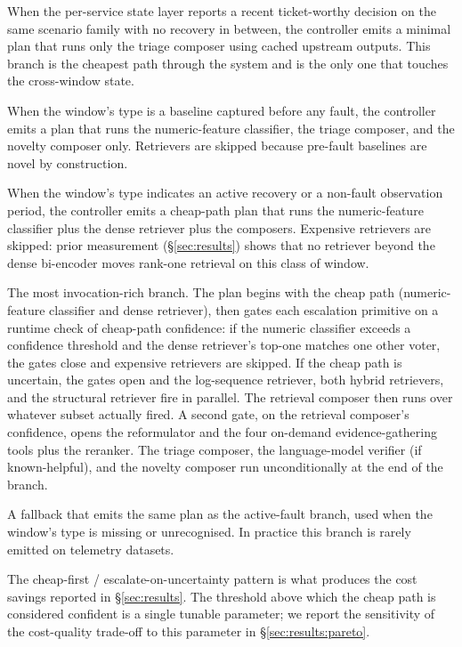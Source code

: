  When the per-service state layer reports a recent ticket-worthy decision on the same scenario family with no recovery in between, the controller emits a minimal plan that runs only the triage composer using cached upstream outputs. This branch is the cheapest path through the system and is the only one that touches the cross-window state.

 When the window's type is a baseline captured before any fault, the controller emits a plan that runs the numeric-feature classifier, the triage composer, and the novelty composer only. Retrievers are skipped because pre-fault baselines are novel by construction.

 When the window's type indicates an active recovery or a non-fault observation period, the controller emits a cheap-path plan that runs the numeric-feature classifier plus the dense retriever plus the composers. Expensive retrievers are skipped: prior measurement (\S\ref{sec:results}) shows that no retriever beyond the dense bi-encoder moves rank-one retrieval on this class of window.

 The most invocation-rich branch. The plan begins with the cheap path (numeric-feature classifier and dense retriever), then gates each escalation primitive on a runtime check of cheap-path confidence: if the numeric classifier exceeds a confidence threshold and the dense retriever's top-one matches one other voter, the gates close and expensive retrievers are skipped. If the cheap path is uncertain, the gates open and the log-sequence retriever, both hybrid retrievers, and the structural retriever fire in parallel. The retrieval composer then runs over whatever subset actually fired. A second gate, on the retrieval composer's confidence, opens the reformulator and the four on-demand evidence-gathering tools plus the reranker. The triage composer, the language-model verifier (if known-helpful), and the novelty composer run unconditionally at the end of the branch.

 A fallback that emits the same plan as the active-fault branch, used when the window's type is missing or unrecognised. In practice this branch is rarely emitted on telemetry datasets.

The cheap-first / escalate-on-uncertainty pattern is what produces the cost savings reported in \S\ref{sec:results}. The threshold above which the cheap path is considered confident is a single tunable parameter; we report the sensitivity of the cost-quality trade-off to this parameter in \S\ref{sec:results:pareto}.

